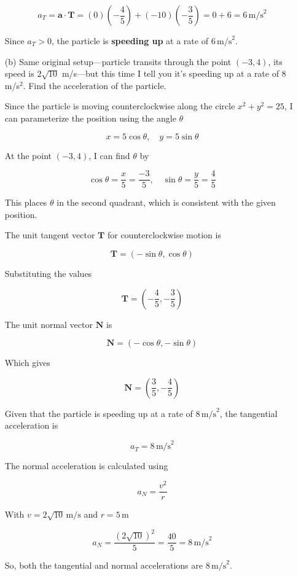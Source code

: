 \documentclass[12pt]{article}
\begin{document}
\begin{enumerate}
\[
a_T = \mathbf{a} \cdot \mathbf{T} = \left( 0 \right) \left( -\frac{4}{5} \right) + \left( -10 \right) \left( -\frac{3}{5} \right) = 0 + 6 = 6 \, \text{m/s}^2
\]

Since \( a_T > 0 \), the particle is \textbf{speeding up} at a rate of \( 6 \, \text{m/s}^2 \).

    \item[(b)] Same original setup---particle transits through the point $(-3, 4)$, its speed is $2\sqrt{10}$ m/s---but this time I tell you it’s speeding up at a rate of 8 m/s$^2$. Find the acceleration of the particle.


Since the particle is moving counterclockwise along the circle \( x^2 + y^2 = 25 \), I can parameterize the position using the angle \(\theta\)

\[
x = 5 \cos \theta, \quad y = 5 \sin \theta
\]

At the point \((-3, 4)\), I can find \(\theta\) by

\[
\cos \theta = \frac{x}{5} = \frac{-3}{5}, \quad \sin \theta = \frac{y}{5} = \frac{4}{5}
\]

This places \(\theta\) in the second quadrant, which is consistent with the given position.

The unit tangent vector \(\mathbf{T}\) for counterclockwise motion is

\[
\mathbf{T} = \left( -\sin \theta, \cos \theta \right)
\]

Substituting the values

\[
\mathbf{T} = \left( -\frac{4}{5}, -\frac{3}{5} \right)
\]

The unit normal vector \(\mathbf{N}\) is

\[
\mathbf{N} = \left( -\cos \theta, -\sin \theta \right)
\]

Which gives

\[
\mathbf{N} = \left( \frac{3}{5}, -\frac{4}{5} \right)
\]

Given that the particle is speeding up at a rate of \(8 \, \text{m/s}^2\), the tangential acceleration is

\[
a_T = 8 \, \text{m/s}^2
\]

The normal acceleration is calculated using

\[
a_N = \frac{v^2}{r}
\]

With \(v = 2\sqrt{10} \, \text{m/s}\) and \(r = 5 \, \text{m}\)

\[
a_N = \frac{(2\sqrt{10})^2}{5} = \frac{40}{5} = 8 \, \text{m/s}^2
\]

So, both the tangential and normal accelerations are \(8 \, \text{m/s}^2\).


\end{enumerate}
\end{document}
